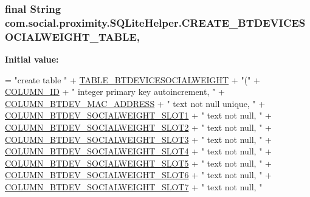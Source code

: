 \subsubsection[{C\+R\+E\+A\+T\+E\+\_\+\+B\+T\+D\+E\+V\+I\+C\+E\+S\+O\+C\+I\+A\+L\+W\+E\+I\+G\+H\+T\+\_\+\+T\+A\+B\+L\+E}]{\setlength{\rightskip}{0pt plus 5cm}final String com.\+social.\+proximity.\+S\+Q\+Lite\+Helper.\+C\+R\+E\+A\+T\+E\+\_\+\+B\+T\+D\+E\+V\+I\+C\+E\+S\+O\+C\+I\+A\+L\+W\+E\+I\+G\+H\+T\+\_\+\+T\+A\+B\+L\+E\hspace{0.3cm}{\ttfamily [static]}, {\ttfamily [private]}}\label{classcom_1_1social_1_1proximity_1_1_s_q_lite_helper_a2ffdca634cf057e96a94972b2e5704e4}
{\bfseries Initial value\+:}
\begin{DoxyCode}
= \textcolor{stringliteral}{"create table "}
              + \hyperlink{classcom_1_1social_1_1proximity_1_1_s_q_lite_helper_a151e3b34b78b984d2dde9c2ea58d549e}{TABLE\_BTDEVICESOCIALWEIGHT} + \textcolor{stringliteral}{"("}
              + \hyperlink{classcom_1_1social_1_1proximity_1_1_s_q_lite_helper_ae0e5a93fedecddb46106b02b939e4601}{COLUMN\_ID} + \textcolor{stringliteral}{" integer primary key autoincrement, "}
              + \hyperlink{classcom_1_1social_1_1proximity_1_1_s_q_lite_helper_a24fb4cdd15815c0527eecadbb7fb5f12}{COLUMN\_BTDEV\_MAC\_ADDRESS} + \textcolor{stringliteral}{" text not null unique, "}
              + \hyperlink{classcom_1_1social_1_1proximity_1_1_s_q_lite_helper_adfc6730a2f078bba8844101b011fc377}{COLUMN\_BTDEV\_SOCIALWEIGHT\_SLOT1} + \textcolor{stringliteral}{" text not null, "}
              + \hyperlink{classcom_1_1social_1_1proximity_1_1_s_q_lite_helper_af21ae06cc954eb56b05dabcb682e3571}{COLUMN\_BTDEV\_SOCIALWEIGHT\_SLOT2} + \textcolor{stringliteral}{" text not null, "}
              + \hyperlink{classcom_1_1social_1_1proximity_1_1_s_q_lite_helper_af648dcc55968d0857315b6f1e2ea7bd5}{COLUMN\_BTDEV\_SOCIALWEIGHT\_SLOT3} + \textcolor{stringliteral}{" text not null, "}
              + \hyperlink{classcom_1_1social_1_1proximity_1_1_s_q_lite_helper_a71c55d8a651651735eb03c39bfd33ffe}{COLUMN\_BTDEV\_SOCIALWEIGHT\_SLOT4} + \textcolor{stringliteral}{" text not null, "}
              + \hyperlink{classcom_1_1social_1_1proximity_1_1_s_q_lite_helper_acf03bd9df5a5d9aff1736e8279f0c18f}{COLUMN\_BTDEV\_SOCIALWEIGHT\_SLOT5} + \textcolor{stringliteral}{" text not null, "}
              + \hyperlink{classcom_1_1social_1_1proximity_1_1_s_q_lite_helper_aba87fe71d289765dc72304a6474eb21b}{COLUMN\_BTDEV\_SOCIALWEIGHT\_SLOT6} + \textcolor{stringliteral}{" text not null, "}
              + \hyperlink{classcom_1_1social_1_1proximity_1_1_s_q_lite_helper_af4e04fe6db4068a7bc14dd98ceb4ad46}{COLUMN\_BTDEV\_SOCIALWEIGHT\_SLOT7} + \textcolor{stringliteral}{" text not null, "}

\end{DoxyCode}
